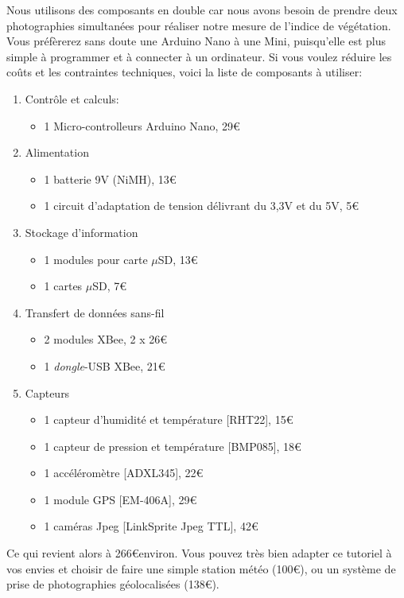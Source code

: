 \documentclass[twocolumn,landscape, 8pt]{article}
\begin{document}
\par Nous utilisons des composants en double car nous avons besoin de prendre deux photographies simultanées pour réaliser notre mesure de l'indice de végétation. Vous préfèrerez sans doute une Arduino Nano à une Mini, puisqu'elle est plus simple à programmer et à connecter à un ordinateur. Si vous voulez réduire les coûts et les contraintes techniques, voici la liste de composants à utiliser:
\begin{enumerate}
	\item Contrôle et calculs:
		\begin{itemize}
			\item 1 Micro-controlleurs Arduino Nano, 29\euro
		\end{itemize}
	\item Alimentation
		\begin{itemize}
			\item 1 batterie 9V (NiMH), 13\euro
			\item 1 circuit d'adaptation de tension délivrant du 3,3V et du 5V, 5\euro
		\end{itemize}
	\item Stockage d'information
		\begin{itemize}
			\item 1 modules pour carte $\mu$SD, 13\euro
			\item 1 cartes $\mu$SD, 7\euro
		\end{itemize}
	\item Transfert de données sans-fil
		\begin{itemize}
			\item 2 modules XBee, 2 x 26\euro 
			\item 1 \textit{dongle}-USB XBee, 21\euro
		\end{itemize}
	\item Capteurs
		\begin{itemize}
			\item 1 capteur d'humidité et température [RHT22], 15\euro
			\item 1 capteur de pression et température [BMP085], 18\euro
			\item 1 accéléromètre [ADXL345], 22\euro
			\item 1 module GPS [EM-406A], 29\euro 
			\item 1 caméras Jpeg [LinkSprite Jpeg TTL], 42\euro
		\end{itemize}
\end{enumerate}
Ce qui revient alors à 266\euro environ. Vous pouvez très bien adapter ce tutoriel à vos envies et choisir de faire une simple station météo (100\euro), ou un système de prise de photographies géolocalisées (138\euro).
\end{document}

